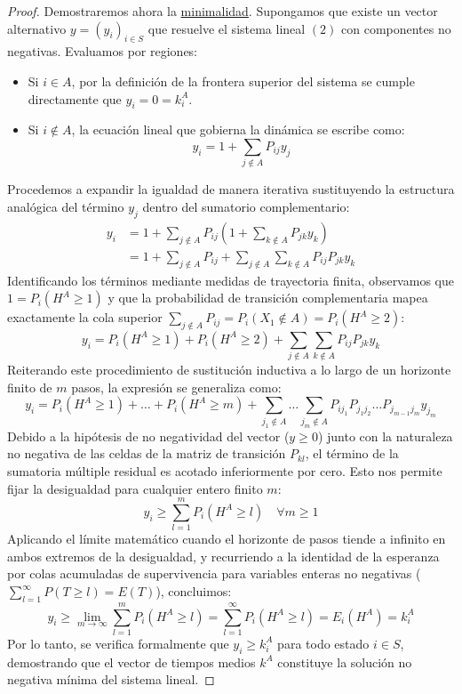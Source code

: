 \begin{teo}
\begin{proof}
    \noindent
    Demostraremos ahora la \underline{minimalidad}. Supongamos que existe un vector alternativo $y = (y_i)_{i \in S}$ que resuelve el sistema lineal $(2)$ con componentes no negativas. Evaluamos por regiones:
    \begin{itemize}
        \item Si $i \in A$, por la definición de la frontera superior del sistema se cumple directamente que $y_i = 0 = k_i^A$.
        \item Si $i \notin A$, la ecuación lineal que gobierna la dinámica se escribe como:
        \[
        y_i = 1 + \sum_{j \notin A} P_{ij} y_j
        \]
    \end{itemize}
    Procedemos a expandir la igualdad de manera iterativa sustituyendo la estructura analógica del término $y_j$ dentro del sumatorio complementario:
    \begin{align*}
        y_i &= 1 + \sum_{j \notin A} P_{ij} \left( 1 + \sum_{k \notin A} P_{jk} y_k \right) \\
        &= 1 + \sum_{j \notin A} P_{ij} + \sum_{j \notin A} \sum_{k \notin A} P_{ij} P_{jk} y_k
    \end{align*}
    Identificando los términos mediante medidas de trayectoria finita, observamos que $1 = P_i(H^A \geq 1)$ y que la probabilidad de transición complementaria mapea exactamente la cola superior $\sum_{j \notin A} P_{ij} = P_i(X_1 \notin A) = P_i(H^A \geq 2)$:
    \[
    y_i = P_i(H^A \geq 1) + P_i(H^A \geq 2) + \sum_{j \notin A} \sum_{k \notin A} P_{ij} P_{jk} y_k
    \]
    Reiterando este procedimiento de sustitución inductiva a lo largo de un horizonte finito de $m$ pasos, la expresión se generaliza como:
    \[
    y_i = P_i(H^A \geq 1) + \dots + P_i(H^A \geq m) + \sum_{j_1 \notin A} \dots \sum_{j_m \notin A} P_{i j_1} P_{j_1 j_2} \dots P_{j_{m-1} j_m} y_{j_m}
    \]
    Debido a la hipótesis de no negatividad del vector ($y \geq 0$) junto con la naturaleza no negativa de las celdas de la matriz de transición $P_{kl}$, el término de la sumatoria múltiple residual es acotado inferiormente por cero. Esto nos permite fijar la desigualdad para cualquier entero finito $m$:
    \[
    y_i \geq \sum_{l=1}^{m} P_i(H^A \geq l) \quad \forall m \geq 1
    \]
    Aplicando el límite matemático cuando el horizonte de pasos tiende a infinito en ambos extremos de la desigualdad, y recurriendo a la identidad de la esperanza por colas acumuladas de supervivencia para variables enteras no negativas ($\sum_{l=1}^{\infty} P(T \geq l) = E(T)$), concluimos:
    \[
    y_i \geq \lim_{m \to \infty} \sum_{l=1}^{m} P_i(H^A \geq l) = \sum_{l=1}^{\infty} P_i(H^A \geq l) = E_i(H^A) = k_i^A
    \]
    Por lo tanto, se verifica formalmente que $y_i \geq k_i^A$ para todo estado $i \in S$, demostrando que el vector de tiempos medios $k^A$ constituye la solución no negativa mínima del sistema lineal.
\end{proof}
\end{teo}

